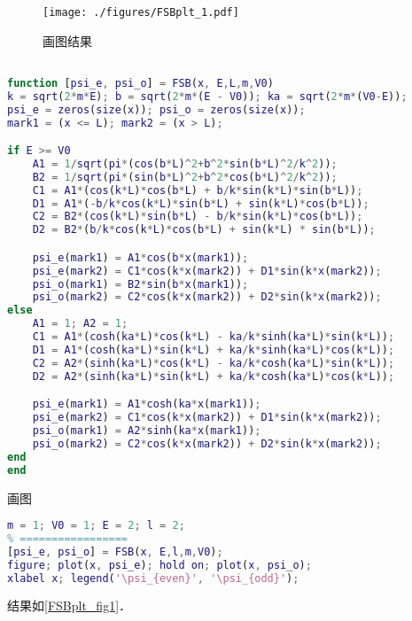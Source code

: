 
\begin{issues}
\issueDraft
\end{issues}


\begin{figure}[ht]
\centering
\texttt{[image: ./figures/FSBplt\_1.pdf]}
\caption{画图结果} \label{FSBplt_fig1}
\end{figure}

\begin{lstlisting}[language=matlab, caption=FSB.m]
% m 质量，V0 势垒，E 能量， L 势垒半宽;

function [psi_e, psi_o] = FSB(x, E,L,m,V0)
k = sqrt(2*m*E); b = sqrt(2*m*(E - V0)); ka = sqrt(2*m*(V0-E));
psi_e = zeros(size(x)); psi_o = zeros(size(x));
mark1 = (x <= L); mark2 = (x > L);

if E >= V0
    A1 = 1/sqrt(pi*(cos(b*L)^2+b^2*sin(b*L)^2/k^2));
    B2 = 1/sqrt(pi*(sin(b*L)^2+b^2*cos(b*L)^2/k^2));
    C1 = A1*(cos(k*L)*cos(b*L) + b/k*sin(k*L)*sin(b*L));
    D1 = A1*(-b/k*cos(k*L)*sin(b*L) + sin(k*L)*cos(b*L));
    C2 = B2*(cos(k*L)*sin(b*L) - b/k*sin(k*L)*cos(b*L));
    D2 = B2*(b/k*cos(k*L)*cos(b*L) + sin(k*L) * sin(b*L));

    psi_e(mark1) = A1*cos(b*x(mark1));
    psi_e(mark2) = C1*cos(k*x(mark2)) + D1*sin(k*x(mark2));
    psi_o(mark1) = B2*sin(b*x(mark1));
    psi_o(mark2) = C2*cos(k*x(mark2)) + D2*sin(k*x(mark2));
else
    A1 = 1; A2 = 1;
    C1 = A1*(cosh(ka*L)*cos(k*L) - ka/k*sinh(ka*L)*sin(k*L));
    D1 = A1*(cosh(ka*L)*sin(k*L) + ka/k*sinh(ka*L)*cos(k*L));
    C2 = A2*(sinh(ka*L)*cos(k*L) - ka/k*cosh(ka*L)*sin(k*L));
    D2 = A2*(sinh(ka*L)*sin(k*L) + ka/k*cosh(ka*L)*cos(k*L));

    psi_e(mark1) = A1*cosh(ka*x(mark1));
    psi_e(mark2) = C1*cos(k*x(mark2)) + D1*sin(k*x(mark2));
    psi_o(mark1) = A2*sinh(ka*x(mark1));
    psi_o(mark2) = C2*cos(k*x(mark2)) + D2*sin(k*x(mark2));
end
end
\end{lstlisting}

画图
\begin{lstlisting}[language=matlab]
% === 设置参数 =====
m = 1; V0 = 1; E = 2; l = 2;
% =================
[psi_e, psi_o] = FSB(x, E,l,m,V0);
figure; plot(x, psi_e); hold on; plot(x, psi_o);
xlabel x; legend('\psi_{even}', '\psi_{odd}');
\end{lstlisting}
结果如\autoref{FSBplt_fig1}．
